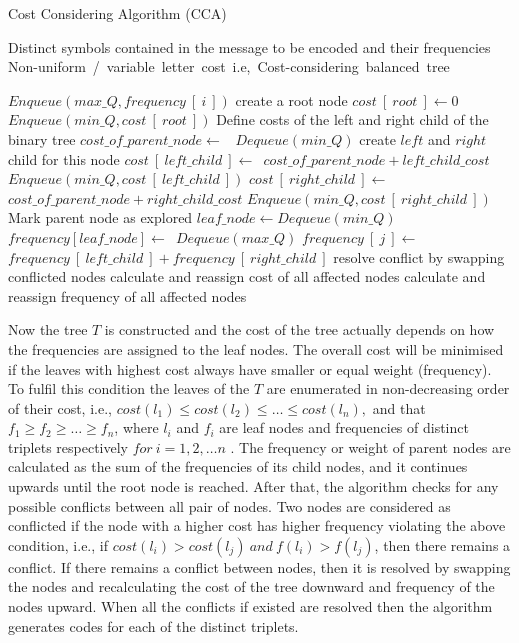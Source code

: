 \documentclass[twocolumn,12pt,a4paper]{article}
\begin{document}
\begin{algorithm}[!btph]
\caption{Cost Considering Algorithm (CCA)}
\label{alg1}

\begin{algorithmic}[1]
\REQUIRE Distinct symbols contained in the message to be encoded and their frequencies 
\ENSURE Non-uniform\ /\ variable\ letter\ cost\ i.e,\ Cost-considering\ balanced\ tree

\STATE $ Enqueue\left(max\_Q , frequency~[~i~]\right)$
\ENDFOR
\STATE create a root node
\STATE $cost~[~root~]\leftarrow 0$
\STATE $Enqueue\left(min\_Q , cost~[~root~]\right)$
\STATE Define costs of the left and right child of the binary tree
\REPEAT 
\STATE $cost\_of\_parent\_node\leftarrow$~ $Dequeue\left(min\_Q\right)$
\STATE create $left$ and $right$ child for this node
\STATE $cost~[~left\_child~]\leftarrow$~$ cost\_of\_parent\_node+left\_child\_cost$
\STATE $Enqueue\left(min\_Q , cost~[~left\_child~]\right)$
\STATE $cost~[~right\_child~]\leftarrow$~$ cost\_of\_parent\_node+right\_child\_cost$
\STATE $Enqueue\left(min\_Q , cost~[~right\_child~]\right)$
\STATE Mark parent node as explored
\STATE $leaf\_node\leftarrow Dequeue\left(min\_Q\right)$
\STATE $frequency[leaf\_node]\leftarrow$~$ Dequeue\left(max\_Q\right)$
\ENDWHILE
{} 
\STATE $frequency~[~j~]\leftarrow$~$ frequency~[~left\_child~]+frequency~[~right\_child~]$
\ENDFOR
\REPEAT
{} 
\STATE resolve conflict by swapping conflicted nodes
\STATE calculate and reassign cost of all affected nodes
\STATE calculate and reassign frequency of all affected nodes 
\ENDIF
{}
\end{algorithmic}
\end{algorithm}

Now the tree $T$ is constructed and the cost of the tree actually depends on how the frequencies are assigned to the leaf nodes. The overall cost will be minimised if the leaves with highest cost always have smaller or equal weight (frequency). To fulfil this condition the leaves of the $T$ are enumerated in non-decreasing order of their cost, i.e., $cost(l_1)\leq cost(l_2)\leq \ldots \leq cost(l_n),$ and that $f_1 \geq f_2 \geq \ldots\geq f_n$, where $l_i$ and $f_i$ are leaf nodes and frequencies of distinct triplets respectively $for~ i=1,2,\ldots n$ . The frequency or weight of parent nodes are calculated as the sum of the frequencies of its child nodes, and it continues upwards until the root node is reached. After that, the algorithm checks for any possible conflicts between all pair of nodes. Two nodes are considered as conflicted if the node with a higher cost has higher frequency violating the above condition, i.e., if $cost(l_i)> cost(l_j)~and~f(l_i)>f(l_j)$, then there remains a conflict.  If there remains a conflict between nodes, then it is resolved by swapping the nodes and recalculating the cost of the tree downward and frequency of the nodes upward.  When all the conflicts if existed are resolved then the algorithm generates codes for each of the distinct triplets.   
\end{document}
